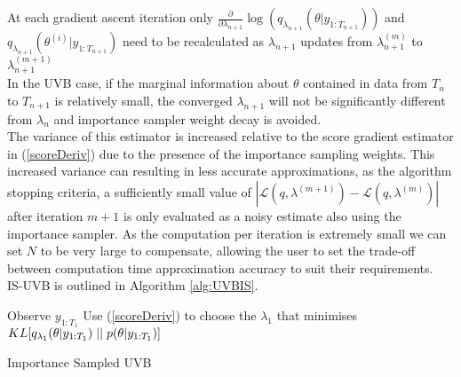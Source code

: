 \documentclass[12pt,a4paper]{article}\usepackage[]{graphicx}\usepackage[]{color}
\begin{document}
At each gradient ascent iteration only $\frac{\partial}{\partial \lambda_{n+1}} \log(q_{\lambda_{n+1}}(\theta | y_{1:T_{n+1}}))$ and $q_{\lambda_{n+1}}(\theta^{(i)} | y_{1:T_{n+1}})$ need to be recalculated as $\lambda_{n+1}$ updates from $\lambda_{n+1}^{(m)}$ to $\lambda_{n+1}^{(m+1)}$
\\

In the UVB case, if the marginal information about $\theta$ contained in data from $T_n$ to $T_{n+1}$ is relatively small, the converged $\lambda_{n+1}$ will not be significantly different from $\lambda_n$ and importance sampler weight decay is avoided.
\\

The variance of this estimator is increased relative to the score gradient estimator in (\ref{scoreDeriv}) due to the presence of the importance sampling weights. This increased variance can resulting in less accurate approximations, as the algorithm stopping criteria, a sufficiently small value of $|\mathcal{L}(q, \lambda^{(m+1)}) - \mathcal{L}(q, \lambda^{(m)})|$ after iteration $m+1$ is only evaluated as a noisy estimate also using the importance sampler. As the computation per iteration is extremely small we can set $N$ to be very large to compensate, allowing the user to set the trade-off between computation time approximation accuracy to suit their requirements.
\\

IS-UVB is outlined in Algorithm \ref{alg:UVBIS}.
\\

\vspace{2mm}
\begin{algorithm}[H]
 Observe $y_{1:T_1}$\;
 Use (\ref{scoreDeriv}) to choose the $\lambda_1$ that minimises $KL[q_{\lambda_1}(\theta |y_{1:T_1})\hspace{.1cm}||\hspace{.1cm}p(\theta |y_{1:T_1})]$\;
 \caption{Importance Sampled UVB}
  \label{alg:UVBIS}
\end{algorithm}
\end{document}
